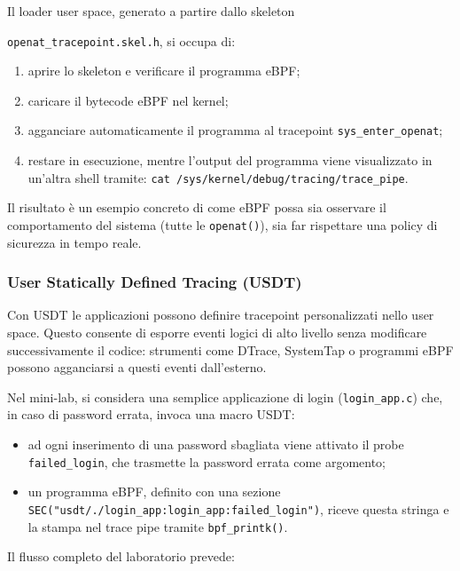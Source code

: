Il loader user space, generato a partire dallo skeleton

\texttt{openat\_tracepoint.skel.h}, si occupa di:

\begin{enumerate}
  \item aprire lo skeleton e verificare il programma eBPF;
  \item caricare il bytecode eBPF nel kernel;
  \item agganciare automaticamente il programma al tracepoint
        \texttt{sys\_enter\_openat};
  \item restare in esecuzione, mentre l’output del programma viene visualizzato
        in un’altra shell tramite:
        \texttt{cat /sys/kernel/debug/tracing/trace\_pipe}.
\end{enumerate}

Il risultato è un esempio concreto di come eBPF possa sia osservare il
comportamento del sistema (tutte le \texttt{openat()}), sia far rispettare
una policy di sicurezza in tempo reale.

\newpage

\subsubsection{User Statically Defined Tracing (USDT)}

Con USDT le applicazioni possono definire tracepoint personalizzati nello
user space. Questo consente di esporre eventi logici di alto livello senza
modificare successivamente il codice: strumenti come DTrace, SystemTap o
programmi eBPF possono agganciarsi a questi eventi dall’esterno.

Nel mini-lab, si considera una semplice applicazione di login
(\texttt{login\_app.c}) che, in caso di password errata, invoca una macro
USDT:

\begin{itemize}
  \item ad ogni inserimento di una password sbagliata viene attivato il probe
        \texttt{failed\_login}, che trasmette la password errata come argomento;
  \item un programma eBPF, definito con una sezione
        \texttt{SEC("usdt/./login\_app:login\_app:failed\_login")}, riceve
        questa stringa e la stampa nel trace pipe tramite \texttt{bpf\_printk()}.
\end{itemize}

Il flusso completo del laboratorio prevede:

